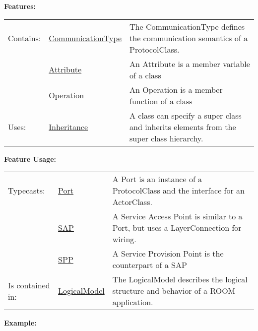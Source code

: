		
		\begingroup
		\textbf{Features:}
		\renewcommand{\arraystretch}{1.8} %
		\begin{longtable}{l|l p{}}
			\hline
		Contains: & \tabitem \hyperlink{ref:CommunicationType}{CommunicationType}  & The CommunicationType defines the communication semantics of a ProtocolClass.\\
		& \tabitem \hyperlink{ref:Attribute}{Attribute}  & An Attribute is a member variable of a class \\
		& \tabitem \hyperlink{ref:Operation}{Operation}  & An Operation is a member function of a class \\
		\hline
		Uses: & \tabitem \hyperlink{ref:Inheritance}{Inheritance}  & A class can specify a super class and inherits elements from the super class hierarchy.\\
		\hline
		\end{longtable}
		\endgroup
		
		\begingroup
		\textbf{Feature Usage:}
		\renewcommand{\arraystretch}{1.8} %
		\begin{longtable}{l|l p{}}
			\hline
		Typecasts: & \tabitem \hyperlink{ref:Port}{Port}  & A Port is an instance of a ProtocolClass and the interface for an ActorClass.\\
		& \tabitem \hyperlink{ref:SAP}{SAP}  & A Service Access Point is similar to a Port, but uses a LayerConnection for wiring. \\
		& \tabitem \hyperlink{ref:SPP}{SPP}  & A Service Provision Point is the counterpart of a SAP \\
		\hline
		Is contained in: & \tabitem \hyperlink{ref:LogicalModel}{LogicalModel}  & The LogicalModel describes the logical structure and behavior of a ROOM application.\\
		\hline
		\end{longtable}
		\endgroup
		
		\textbf{Example:}
		
